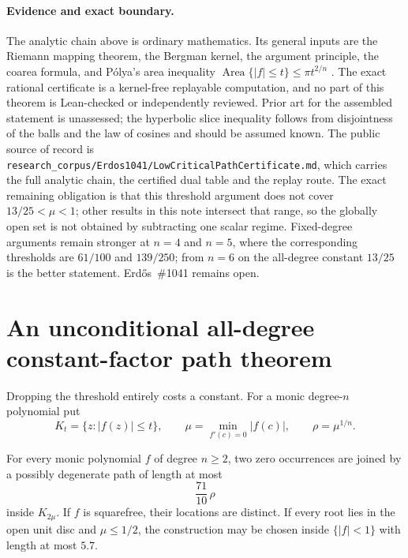 \paragraph{Evidence and exact boundary.}
\label{bdry:low-critical-closure}
The analytic chain above is ordinary mathematics.  Its general inputs are the
Riemann mapping theorem, the Bergman kernel, the argument principle, the
coarea formula, and P\'olya's area inequality
$\operatorname{Area}\{|f|\le t\}\le\pi t^{2/n}$
\cite[printed pp.~280--282]{polya1928}.  The exact rational certificate is a
kernel-free replayable computation, and no part of this theorem is
Lean-checked or independently reviewed.  Prior art for the assembled statement
is unassessed; the hyperbolic slice inequality follows from disjointness of
the balls and the law of cosines and should be assumed known.  The public
source of record is
\texttt{research\_corpus/Erdos1041/LowCriticalPathCertificate.md}, which
carries the full analytic chain, the certified dual table and the replay
route.  The exact remaining obligation is that this threshold argument does
not cover $13/25<\mu<1$; other results in this note intersect that range, so
the globally open set is not obtained by subtracting one scalar regime.
Fixed-degree arguments remain stronger at $n=4$ and $n=5$, where the
corresponding thresholds are $61/100$ and $139/250$; from $n=6$ on the
all-degree constant $13/25$ is the better statement.  Erd\H{o}s~\#1041 remains
open.

\section{An unconditional all-degree constant-factor path theorem}
\label{sec:constant-factor}

Dropping the threshold entirely costs a constant.  For a monic degree-$n$
polynomial put
\[
 K_t=\{z:|f(z)|\le t\},\qquad
 \mu=\min_{f'(c)=0}|f(c)|,\qquad \rho=\mu^{1/n}.
\]

\begin{theorem}
\label{res:constant-factor-path}
For every monic polynomial $f$ of degree $n\ge2$, two zero occurrences are
joined by a possibly degenerate path of length at most
\[
 \frac{71}{10}\,\rho
\]
inside $K_{2\mu}$.  If $f$ is squarefree, their locations are distinct.
If every root lies in the open unit disc and $\mu\le1/2$, the construction
may be chosen inside $\{|f|<1\}$ with length at most $5.7$.
\end{theorem}

